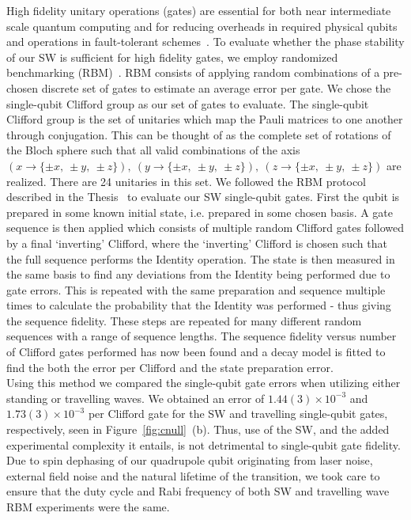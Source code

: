 \documentclass[12pt]{iopart}
\begin{document}
    High fidelity unitary operations (gates) are essential for both
    near intermediate scale quantum computing and for reducing
    overheads in required physical qubits and operations in
    fault-tolerant schemes~\cite{steane_overhead_2003}. To evaluate whether the phase
    stability of our SW is sufficient for high fidelity gates, we
    employ randomized benchmarking (RBM)~\cite{knill_randomized_2008, magesan_scalable_2011}.  RBM consists of
    applying random combinations of a pre-chosen discrete set of gates
    to estimate an average error per gate.  We chose the single-qubit
    Clifford group as our set of gates to evaluate. The single-qubit
    Clifford group is the set of unitaries which map the Pauli
    matrices to one another through conjugation. This can be thought
    of as the complete set of rotations of the Bloch sphere such that
    all valid combinations of the axis
    $(x \rightarrow \{\pm x,~\pm y,~\pm z\}),~(y \rightarrow \{\pm x,~\pm y,~\pm z\}),~(z \rightarrow \{\pm x,~\pm y,~\pm z\})$
    are realized. There are 24 unitaries in this set. We followed the
    RBM protocol described in the Thesis~\cite{hughes_benchmarking_2021} to evaluate our SW
    single-qubit gates. First the qubit is prepared in some known
    initial state, i.e. prepared in some chosen basis. A gate sequence
    is then applied which consists of multiple random Clifford gates
    followed by a final `inverting' Clifford, where the `inverting'
    Clifford is chosen such that the full
    sequence performs the Identity operation. The state is then
    measured in the same basis to find any deviations from the
    Identity being performed due to gate errors. This is repeated with
    the same preparation and sequence multiple times to calculate the
    probability that the Identity was performed - thus giving the
    sequence fidelity. These steps are repeated for many different
    random sequences with a range of sequence lengths. The sequence
    fidelity versus number of Clifford gates performed has now been
    found and a decay model is fitted to find the both the error per
    Clifford and the state preparation error.\\ Using this method we
    compared the single-qubit gate errors when utilizing either
    standing or travelling waves. We obtained an error of $1.44(3)
    \times 10^{-3}$ and $1.73(3) \times 10^{-3}$ per Clifford gate for
    the SW and travelling single-qubit gates, respectively, seen in
    Figure~\ref{fig:cnull}~(b). Thus, use of the SW, and the added
    experimental complexity it entails, is not detrimental to
    single-qubit gate fidelity. Due to spin dephasing of our
    quadrupole qubit originating from laser noise, external field
    noise and the natural lifetime of the transition, we took care to
    ensure that the duty cycle and Rabi frequency of both SW and
    travelling wave RBM experiments were the same. \\
\end{document}
